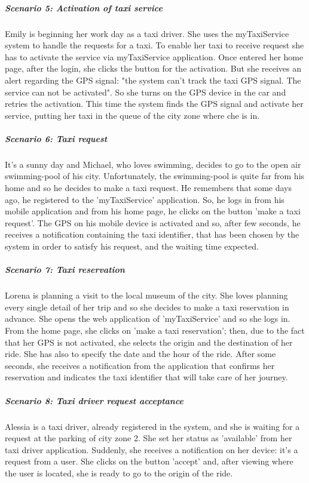 \subparagraph{Scenario 5: Activation of taxi service}
\noindent
\newline
    Emily is beginning her work day as a taxi driver. She uses the myTaxiService system to handle the requests for a taxi. To enable her taxi to receive request she has to activate the service via myTaxiService application. Once entered her home page, after the login, she clicks the button for the activation. But she receives an alert regarding the GPS signal: "the system can't track the taxi GPS signal. The service can not be activated". So she turns on the GPS device in the car and retries the activation. This time the system finds the GPS signal and activate her service, putting her taxi in the queue of the city zone where che is in.
    
\subparagraph{Scenario 6: Taxi request}
\noindent
\newline
    It's a sunny day and Michael, who loves swimming, decides to go to the open air swimming-pool of his city. Unfortunately, the swimming-pool is quite far from his home and so he decides to make a taxi request. He remembers that some days ago, he registered to the 'myTaxiService' application. So, he logs in from his mobile application and from his home page, he clicks on the button 'make a taxi request'. The GPS on his mobile device is activated and so, after few seconds, he receives a notification containing the taxi identifier, that has been chosen by the system in order to satisfy his request, and the waiting time expected.

\subparagraph{Scenario 7: Taxi reservation}
\noindent
\newline
    Lorena is planning a visit to the local museum of the city. She loves planning every single detail of her trip and so she decides to make a taxi reservation in advance. She opens the web application of 'myTaxiService' and so she logs in. From the home page, she clicks on 'make a taxi reservation'; then, due to the fact that her GPS is not activated, she selects the origin and the destination of her ride. She has also to specify the date and the hour of the ride. After some seconds, she receives a notification from the application that confirms her reservation and indicates the taxi identifier that will take care of her journey.

\subparagraph{Scenario 8: Taxi driver request acceptance}
\noindent
\newline
    Alessia is a taxi driver, already registered in the system, and she is waiting for a request at the parking of city zone 2. She set her status as 'available' from her taxi driver application. Suddenly, she receives a notification on her device: it's a request from a user. She clicks on the button 'accept' and, after viewing where the user is located, she is ready to go to the origin of the ride.